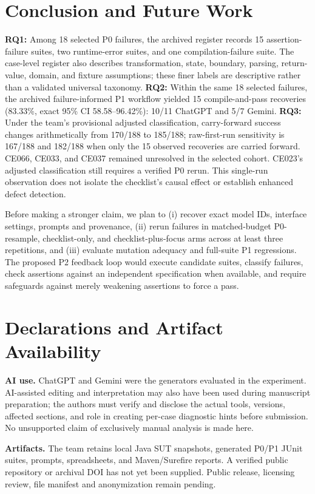 \documentclass[conference]{IEEEtran}
\begin{document}
\section{Conclusion and Future Work}
\textbf{RQ1:} Among 18 selected P0 failures, the archived register records 15 assertion-failure suites, two runtime-error suites, and one compilation-failure suite. The case-level register also describes transformation, state, boundary, parsing, return-value, domain, and fixture assumptions; these finer labels are descriptive rather than a validated universal taxonomy. \textbf{RQ2:} Within the same 18 selected failures, the archived failure-informed P1 workflow yielded 15 compile-and-pass recoveries (83.33\%, exact 95\% CI 58.58--96.42\%): 10/11 ChatGPT and 5/7 Gemini. \textbf{RQ3:} Under the team's provisional adjusted classification, carry-forward success changes arithmetically from 170/188 to 185/188; raw-first-run sensitivity is 167/188 and 182/188 when only the 15 observed recoveries are carried forward. CE066, CE033, and CE037 remained unresolved in the selected cohort. CE023's adjusted classification still requires a verified P0 rerun. This single-run observation does not isolate the checklist's causal effect or establish enhanced defect detection.

Before making a stronger claim, we plan to (i) recover exact model IDs, interface settings, prompts and provenance, (ii) rerun failures in matched-budget P0-resample, checklist-only, and checklist-plus-focus arms across at least three repetitions, and (iii) evaluate mutation adequacy and full-suite P1 regressions. The proposed P2 feedback loop would execute candidate suites, classify failures, check assertions against an independent specification when available, and require safeguards against merely weakening assertions to force a pass.

\section*{Declarations and Artifact Availability}
\textbf{AI use.} ChatGPT and Gemini were the generators evaluated in the experiment. AI-assisted editing and interpretation may also have been used during manuscript preparation; the authors must verify and disclose the actual tools, versions, affected sections, and role in creating per-case diagnostic hints before submission. No unsupported claim of exclusively manual analysis is made here.

\textbf{Artifacts.} The team retains local Java SUT snapshots, generated P0/P1 JUnit suites, prompts, spreadsheets, and Maven/Surefire reports. A verified public repository or archival DOI has not yet been supplied. Public release, licensing review, file manifest and anonymization remain pending.
\end{document}
